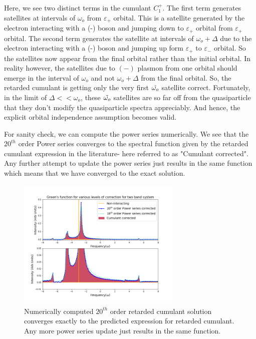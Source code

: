 \documentclass{article}
\begin{document}
Here, we see two distinct terms in the cumulant $C_1^+$. The first term generates satellites at intervals of $\omega_o$ from $\varepsilon_+$ orbital. This is a satellite generated by the electron interacting with a (-) boson and jumping down to $\varepsilon_+$ orbital from $\varepsilon_+$ orbital. The second term generates the satellite at intervals of $\omega_o+\Delta$ due to the electron interacting with a (-) boson and jumping up form $\varepsilon_+$ to $\varepsilon_-$ orbital. So the satellites now appear from the final orbital rather than the initial orbital.  In reality however, the satellites due to $(-)$ plasmon from one orbital should emerge in the interval of $\omega_o$ and not $\omega_o + \Delta$ from the final orbital. So, the retarded cumulant is getting only the very first ${\Tilde{\omega_o}}$ satellite correct. Fortunately, in the limit of $\Delta <<\omega_o$, these ${\Tilde{\omega_o}}$ satellites are so far off from the quasiparticle that they don't modify the quasiparticle spectra appreciably. And hence, the explicit orbital independence assumption becomes valid.

For sanity check, we can compute the power series numerically. We see that the $20^{th}$ order Power series converges to the spectral function given by the retarded cumulant expression in the literature- here referred to as "Cumulant corrected". Any further attempt to update the power series just results in the same function which means that we have converged to the exact solution.
\begin{figure}[htp]
    \centering
    \includegraphics[width = 0.7\textwidth]{Single_boson_two_band_ret_cml.png}
    \caption{Numerically computed $20^{th}$ order retarded cumulant solution converges exactly to the predicted expression for retarded cumulant. Any more power series update just results in the same function. }
    \label{retarded cumulant}
\end{figure}
\end{document}
